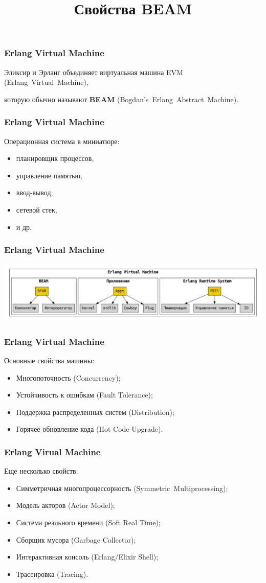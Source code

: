 \documentclass[10pt]{beamer}
\title{Свойства BEAM}
\begin{document}
\begin{frame}
  \frametitle{Erlang Virtual Machine}
  Эликсир и Эрланг объединяет виртуальная машина EVM (Erlang~Virtual~Machine),
  \par \bigskip
  которую обычно называют \textbf{BEAM} (Bogdan's~Erlang~Abstract~Machine).
\end{frame}

\begin{frame}
  \frametitle{Erlang Virtual Machine}
  Операционная система в миниатюре:
  \begin{itemize}
  \item планировщик процессов,
  \item управление памятью,
  \item ввод-вывод,
  \item сетевой стек,
  \item и др.
  \end{itemize}
\end{frame}

\begin{frame}
  \frametitle{Erlang Virtual Machine}
  \includegraphics[scale=0.2]{evm}
\end{frame}

\begin{frame}
  \frametitle{Erlang Virtual Machine}
  Основные свойства машины:
  \begin{itemize}
  \item Многопоточность (Concurrency);
  \item Устойчивость к ошибкам (Fault Tolerance);
  \item Поддержка распределенных систем (Distribution);
  \item Горячее обновление кода (Hot Code Upgrade).
  \end{itemize}
\end{frame}

\begin{frame}
  \frametitle{Erlang Virual Machine}
  Еще несколько свойств:
  \begin{itemize}
  \item Симметричная многопроцессорность (Symmetric~Multiprocessing);
  \item Модель акторов (Actor Model);
  \item Система реального времени (Soft Real Time);
  \item Сборщик мусора (Garbage Collector);
  \item Интерактивная консоль (Erlang/Elixir Shell);
  \item Трассировка (Tracing).
  \end{itemize}
\end{frame}
\end{document}
